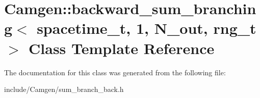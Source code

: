 \hypertarget{a00023}{\section{Camgen\-:\-:backward\-\_\-sum\-\_\-branching$<$ spacetime\-\_\-t, 1, N\-\_\-out, rng\-\_\-t $>$ Class Template Reference}
\label{a00023}
}


The documentation for this class was generated from the following file\-:\begin{DoxyCompactItemize}
\item 
include/\-Camgen/sum\-\_\-branch\-\_\-back.\-h\end{DoxyCompactItemize}
